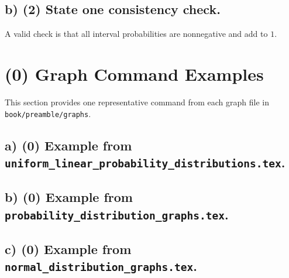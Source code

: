 
\subsection*{b) \textbf{(2)} State one consistency check.}
\label{subsec:example-table-and-probability-summary-c3-b}
A valid check is that all interval probabilities are nonnegative and add to $1$.


\section{(0) Graph Command Examples}
\label{sec:graph-command-examples}
This section provides one representative command from each graph file in \texttt{book/preamble/graphs}.

\subsection*{a) \textbf{(0)} Example from \texttt{uniform\_linear\_probability\_distributions.tex}.}
\label{subsec:graph-command-examples-a}


\subsection*{b) \textbf{(0)} Example from \texttt{probability\_distribution\_graphs.tex}.}
\label{subsec:graph-command-examples-b}


\subsection*{c) \textbf{(0)} Example from \texttt{normal\_distribution\_graphs.tex}.}
\label{subsec:graph-command-examples-c}



